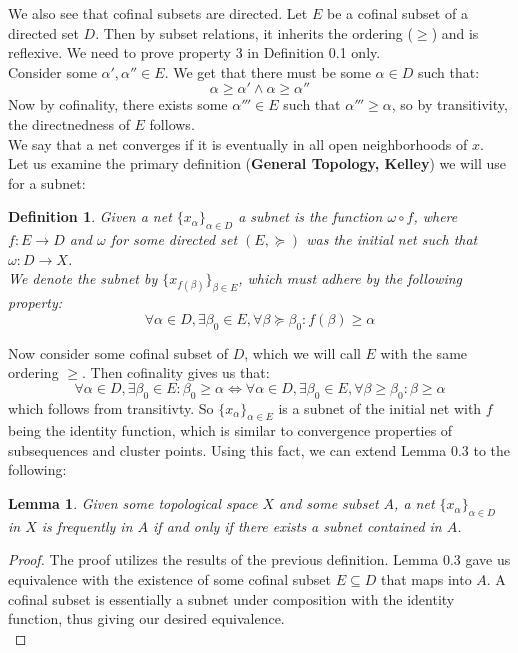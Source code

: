 \documentclass[10pt,letterpaper]{article} %
\newtheorem{lem}{Lemma}[section]
\newtheorem{defn}{Definition}[section]
\begin{document}
We also see that cofinal subsets are directed. Let $E$ be a cofinal subset of a directed set $D$. Then by subset relations, it inherits the ordering ($\geq$) and is reflexive. We need to prove property 3 in Definition 0.1 only.\\

Consider some $\alpha', \alpha'' \in E$. We get that there must be some $\alpha \in D$ such that:
\begin{equation*}
\alpha \geq \alpha' \land \alpha \geq \alpha''
\end{equation*}
Now by cofinality, there exists some $\alpha''' \in E$ such that $\alpha''' \geq \alpha$, so by transitivity, the directnedness of $E$ follows.\\

We say that a net converges if it is eventually in all open neighborhoods of $x$.\\

Let us examine the primary definition (\textbf{General Topology, Kelley}) we will use for a subnet:
\begin{defn}
Given a net $\{x_\alpha\}_{\alpha \in D}$ a subnet is the function $\omega \circ f$, where $f: E \xrightarrow{} D$ and $\omega$ for some directed set $(E, \succcurlyeq)$ was the initial net such that $\omega: D \xrightarrow{} X$.\\

We denote the subnet by $\{x_{f(\beta)}\}_{\beta \in E}$, which must adhere by the following property:
\begin{equation*}
\forall \alpha \in D, \exists \beta_0 \in E, \forall \beta \succcurlyeq \beta_0: f(\beta) \geq \alpha
\end{equation*}
\end{defn}

Now consider some cofinal subset of $D$, which we will call $E$ with the same ordering $\geq$. Then cofinality gives us that:
\begin{equation*}
\forall \alpha \in D, \exists \beta_0 \in E: \beta_0 \geq \alpha \iff \forall \alpha \in D, \exists \beta_0 \in E, \forall \beta \geq \beta_0: \beta \geq \alpha
\end{equation*}
which follows from transitivty. So $\{x_\alpha\}_{\alpha \in E}$ is a subnet of the initial net with $f$ being the identity function, which is similar to convergence properties of subsequences and cluster points. Using this fact, we can extend Lemma 0.3 to the following:
\begin{lem}
Given some topological space $X$ and some subset $A$, a net $\{x_\alpha\}_{\alpha \in D}$ in $X$ is frequently in $A$ if and only if there exists a subnet contained in $A$.   
\end{lem}
\begin{proof}
The proof utilizes the results of the previous definition. Lemma 0.3 gave us equivalence with the existence of some cofinal subset $E \subseteq D$ that maps into $A$. A cofinal subset is essentially a subnet under composition with the identity function, thus giving our desired equivalence.\\
\end{proof}
\end{document}
